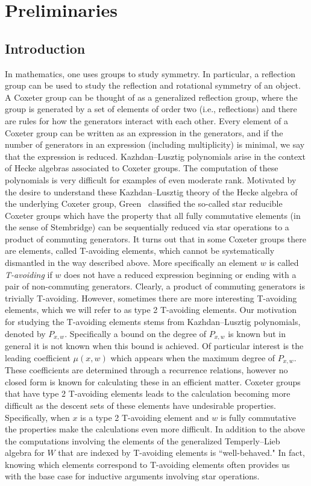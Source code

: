 \chapter{Preliminaries}

\section{Introduction}
In mathematics, one uses groups to study symmetry.  In particular, a reflection group can be used to study the reflection and rotational symmetry of an object.  A Coxeter group can be thought of as a generalized reflection group, where the group is generated by a set of elements of order two (i.e., reflections) and there are rules for how the generators interact with each other.  Every element of a Coxeter group can be written as an expression in the generators, and if the number of generators in an expression (including multiplicity) is minimal, we say that the expression is reduced. Kazhdan--Lusztig polynomials arise in the context of Hecke algebras associated to Coxeter groups. The computation of these polynomials is very difficult for examples of even moderate rank. Motivated by the desire to understand these Kazhdan--Lusztig theory of the Hecke algebra of the underlying Coxeter group, Green~\cite{Green2006a} classified the so-called star reducible Coxeter groups which have the property that all fully commutative elements (in the sense of Stembridge) can be sequentially reduced via star operations to a product of commuting generators. It turns out that in some Coxeter groups there are elements, called T-avoiding elements, which cannot be systematically dismantled in the way described above. More specifically an element $w$ is called \emph{T-avoiding} if $w$ does not have a reduced expression beginning or ending with a pair of non-commuting generators. Clearly, a product of commuting generators is trivially T-avoiding. However, sometimes there are more interesting T-avoiding elements, which we will refer to as type 2 T-avoiding elements. Our motivation for studying the T-avoiding elements stems from Kazhdan--Lusztig polynomials, denoted by $P_{x,w}$. Specifically a bound on the degree of $P_{x,w}$ is known but in general it is not known when this bound is achieved. Of particular interest is the leading coefficient $\mu(x,w)$ which appears when the maximum degree of $P_{x,w}$. These coefficients are determined through a recurrence relations, however no closed form is known for calculating these in an efficient matter. Coxeter groups that have type 2 T-avoiding elements leads to the calculation becoming more difficult as the descent sets of these elements have undesirable properties. Specifically, when $x$ is a type 2 T-avoiding element and $w$ is fully commutative the properties make the calculations even more difficult. In addition to the above the computations involving the elements of the generalized Temperly--Lieb algebra for $W$ that are indexed by T-avoiding elements is ``well-behaved." In fact, knowing which elements correspond to T-avoiding elements often provides us with the base case for inductive arguments involving star operations.

